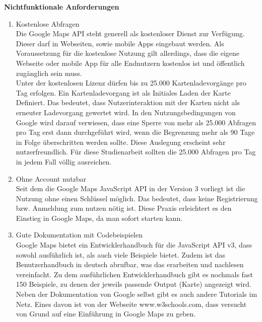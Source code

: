 \textbf{Nichtfunktionale Anforderungen}
\begin{enumerate}
\item Kostenlose Abfragen \\
Die Google Maps API steht generell als kostenloser Dienst zur Verfügung. Dieser darf in Webseiten, sowie mobile Apps eingebaut werden. Als Voraussetzung für die kostenlose Nutzung gilt allerdings, dass die eigene Webseite oder mobile App für alle Endnutzern kostenlos ist und öffentlich zugänglich sein muss.\\
Unter der kostenlosen Lizenz dürfen bis zu 25.000 Kartenladevorgänge pro Tag erfolgen. Ein Kartenladevorgang ist als Initiales Laden der Karte Definiert. Das bedeutet, dass Nutzerinteraktion mit der Karten nicht als erneuter Ladevorgang gewertet wird. 
In den Nutzungsbedingungen von Google wird darauf verwiesen, dass eine Sperre von mehr als 25.000 Abfragen pro Tag erst dann durchgeführt wird, wenn die Begrenzung mehr als 90 Tage in Folge überschritten werden sollte.
Diese Auslegung erscheint sehr nutzerfreundlich. Für diese Studienarbeit sollten die 25.000 Abfragen pro Tag in jedem Fall völlig ausreichen. \cite[Nutzungsbedingungen]{googlemaps}\cite[Lizenzierung]{googlemaps}


\item Ohne Account nutzbar\\
Seit dem die Google Maps JavaScript API in der Version 3 vorliegt ist die Nutzung ohne einen Schlüssel möglich. Das bedeutet, dass keine Registrierung bzw. Anmeldung zum nutzen nötig ist. Diese Praxis erleichtert es den Einstieg in Google Maps, da man sofort starten kann. \cite{googlemapsblog}


\item Gute Dokumentation mit Codebeispielen\\
Google Maps bietet ein Entwicklerhandbuch für die JavaScript API v3, dass sowohl ausführlich ist, als auch viele Beispiele bietet. Zudem ist das Benutzerhandbuch in deutsch abrufbar, was das erarbeiten und nachlesen vereinfacht. 
Zu dem ausführlichen Entwicklerhandbuch gibt es nochmals fast 150 Beispiele, zu denen der jeweils passende Output (Karte) angezeigt wird.\cite[Documentation]{googlemaps} \\
Neben der Dokumentation von Google selbst gibt es auch andere Tutorials im Netz. Eines davon ist von der Webseite www.w3schools.com, dass versucht von Grund auf eine Einführung in Google Maps zu geben. 



\end{enumerate}


